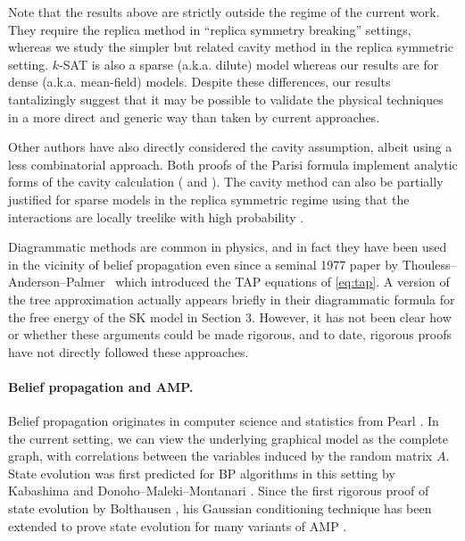 \documentclass[12pt]{article}
\begin{document}
Note that the results above are strictly outside the regime of the
current work. They require the replica method in ``replica symmetry breaking'' settings,
whereas we study the simpler but related cavity method in the replica symmetric setting.
$k$-SAT is also a sparse (a.k.a. dilute) model
whereas our results are for dense (a.k.a. mean-field) models.
Despite these differences, our results tantalizingly suggest that it may be possible
to validate the physical techniques in a more direct and generic way than taken by current approaches.



Other authors have also directly considered the cavity assumption,
albeit using a less combinatorial approach.
Both proofs of the Parisi formula implement analytic forms of the cavity calculation
(\cite[Section 1.6]{talagrandBook} and \cite[Section 3.5]{panchenko2013sherrington}).
The cavity method can also be partially justified for sparse models
in the replica symmetric regime using that the interactions
are locally treelike with high probability \cite{bayati2006rigorous, coja2017information}.


Diagrammatic methods are common in physics,
and in fact they have been used in the vicinity of belief propagation
even since a seminal 1977 paper by Thouless--Anderson--Palmer~\cite{thouless1977solution} which introduced the TAP equations of \cref{eq:tap}.
A version of the tree approximation actually appears briefly in their diagrammatic formula for the free energy of the SK model in Section 3. 
However, it has not been clear how or whether these
arguments could be made rigorous, and to date, rigorous proofs have
not directly followed these approaches.


\vspace{-8pt}
\paragraph{Belief propagation and AMP.}
Belief propagation originates
in computer science and statistics from Pearl \cite{pearl1988probabilistic}.
In the current setting, we can view the underlying graphical model as the complete graph, with correlations between the variables induced by the random matrix $A$.
State evolution was first predicted for BP algorithms in this setting
by Kabashima \cite{kabashima2003cdma} and Donoho--Maleki--Montanari \cite{donoho2009message}. Since the first rigorous proof of state evolution by Bolthausen \cite{bolthausen2014iterative}, his Gaussian conditioning technique has been extended to prove state evolution for
many variants of AMP \cite{bayati2011dynamics, javanmard2013state, ma2017analysis, takeuchi2019rigorous, berthier2020nonseparable, takeuchi2019unified, AMS20:pSpinGlasses, takeuchi2021bayes, lu2021householder, feng2022unifying, fan2022approximate, gerbelot2023graph, huang2023optimization}.
\end{document}
